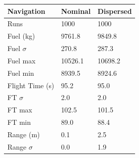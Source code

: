 \begin{table}[H]                                              
	\centering                                                     
	\begin{tabularx}{\textwidth}{@{}lYY@{}}                             
		\toprule                                                         
		\bfseries Navigation & \bfseries Nominal & \bfseries Dispersed \\                                 
        \toprule                                                
		Runs & 1000 & 1000 \\                                          
        \toprule                                                
		Fuel (kg) & 9761.8 & 9849.8 \\                                  
                                                       
		Fuel $\sigma$ & 270.8 & 287.3 \\                               
                                                      
		Fuel max & 10526.1 & 10698.2 \\                                
                                                       
		Fuel min & 8939.5 & 8924.6 \\                                  
	    \toprule                                                   
		Flight Time (s) & 95.2 & 95.0 \\                               
                                                        
		FT $\sigma$ & 2.0 & 2.0 \\                                     
                                                        
		FT max & 102.5 & 101.5 \\                                      
	                                                        
		FT min & 89.0 & 88.4 \\                                        
        \toprule                                              
		Range (m) & 0.1 & 2.5 \\                                       
	                                                       
		Range $\sigma$ & 0.0 & 1.9 \\                                  
                                                        

\end{tabularx}
\end{table}
